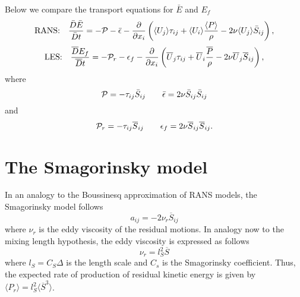 \documentclass[oneside,a4paper,11pt]{report}
\begin{document}
Below we compare the transport equations for $\bar{E}$ and $E_f$
\begin{equation}
\text{RANS:} \quad \frac{\bar{D} \bar{E}}{\bar{D} t} = - \mathcal{P} - \bar{\epsilon} - \frac{\partial}{\partial x_i} \left ( \langle U_j \rangle \tau_{ij} + \langle U_i \rangle \frac{\langle P \rangle}{\rho} - 2\nu \langle U_j \rangle \bar{S}_{ij} \right ),
\end{equation}
\begin{equation}
\text{LES:} \quad \frac{\overline{D} E_f}{ \overline{D} t} = - \mathcal{P}_r - \epsilon_f - \frac{\partial}{\partial x_i} \left ( \overline{U}_j \tau_{ij} + \overline{U}_i \frac{\overline{P}}{\rho} - 2 \nu \overline{U}_j \overline{S}_{ij} \right ) ,
\end{equation}
where 
\begin{equation}
\mathcal{P} = -\tau_{ij} \bar{S}_{ij} \qquad \bar{\epsilon} = 2 \nu \bar{S}_{ij} \bar{S}_{ij}
\end{equation}
and
\begin{equation}
\mathcal{P}_r = -\tau_{ij} \overline{S}_{ij} \qquad \epsilon_f = 2 \nu \overline{S}_{ij} \overline{S}_{ij}.
\end{equation}

\section{The Smagorinsky model}
In an analogy to the Boussinesq approximation of RANS models, the Smagorinsky model follows
\begin{equation}
a_{ij} = -2 \nu_r \overline{S}_{ij}
\end{equation}
where $\nu_r$ is the eddy viscosity of the residual motions. In analogy now to the mixing length hypothesis, the eddy viscosity is expressed as follows
\begin{equation}
\nu_r = l_S^2 \overline{S}
\end{equation}
where $l_S = C_S \Delta$ is the length scale and $C_s$ is the Smagorinsky coefficient. Thus, the expected rate of production of residual kinetic energy is given by $\langle P_r \rangle = l_S^2 \langle \overline{S}^3 \rangle$.
\end{document}
